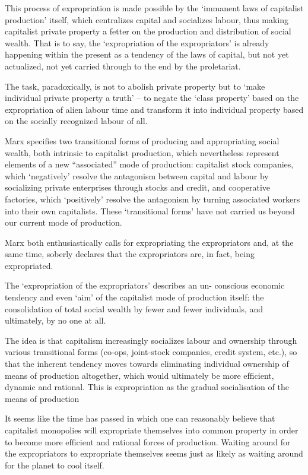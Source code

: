 \documentclass[
]{book}
\begin{document}
This process of expropriation is made possible by the `immanent laws of
capitalist production' itself, which centralizes capital and socializes labour,
thus making capitalist private property a fetter on the production and distribution
of social wealth.
That is to say, the `expropriation of the expropriators' is already happening within the
present as a tendency of the laws of capital, but not yet actualized,
not yet carried through to the end by the proletariat.

The task, paradoxically, is not to abolish private property but to `make individual
private property a truth' -- to negate the `class property' based on the expropriation
of alien labour time and transform it into individual property based on the socially
recognized labour of all.

Marx speciﬁes two transitional forms of producing and appropriating social
wealth, both intrinsic to capitalist production, which nevertheless represent elements of a
new ``associated'' mode of production: capitalist stock companies, which `negatively'
resolve the antagonism between capital and labour by socializing private enterprises
through stocks and credit, and cooperative factories, which `positively' resolve the
antagonism by turning associated workers into their own capitalists.
These `transitional forms' have not carried us beyond our current mode of production.

Marx both enthusiastically calls for expropriating the expropriators and,
at the same time,
soberly declares that the expropriators are, in fact, being expropriated.

The `expropriation of the expropriators' describes an un-
conscious economic tendency and even `aim' of the capitalist mode of production itself:
the consolidation of total social wealth by fewer and fewer individuals, and
ultimately, by no one at all.

The idea is that capitalism
increasingly socializes labour and ownership through various transitional forms (co-ops,
joint-stock companies, credit system, etc.), so that the inherent tendency moves towards
eliminating individual ownership of means of production altogether, which would
ultimately be more efﬁcient, dynamic and rational. This is expropriation as the gradual
socialisation of the means of production

It seems like the time has passed in which one can
reasonably believe that capitalist monopolies will expropriate themselves into common
property in order to become more efﬁcient and rational forces of production. Waiting
around for the expropriators to expropriate themselves seems just as likely as waiting
around for the planet to cool itself.
\end{document}
